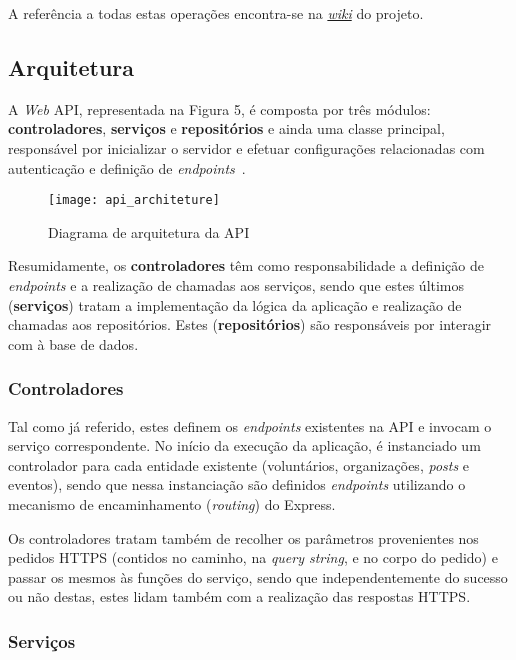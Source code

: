 A referência a todas estas operações encontra-se na \href{https://github.com/leomartins1999/PS1920-G46/wiki}{\textit{wiki}} do projeto.

\subsection{Arquitetura}

A \textit{Web} API, representada na Figura 5, é composta por três módulos: \textbf{controladores}, \textbf{serviços} e \textbf{repositórios} e ainda uma classe principal, responsável por inicializar o servidor e efetuar configurações relacionadas com autenticação e definição de \textit{endpoints}~\cite{Lauret2019,Block2014}.

\begin{figure}[h]
	\centering
	\texttt{[image: api\_architeture]}
	\caption{Diagrama de arquitetura da API}
\end{figure}

Resumidamente, os \textbf{controladores} têm como responsabilidade a definição de \textit{endpoints} e a realização de chamadas aos serviços, sendo que estes últimos (\textbf{serviços}) tratam a implementação da lógica da aplicação e realização de chamadas aos repositórios. Estes (\textbf{repositórios}) são responsáveis por interagir com à base de dados.

\subsubsection{Controladores}

Tal como já referido, estes definem os \textit{endpoints} existentes na API e invocam o serviço correspondente. No início da execução da aplicação, é instanciado um controlador para cada entidade existente (voluntários, organizações, \textit{posts} e eventos), sendo que nessa instanciação são definidos \textit{endpoints} utilizando o mecanismo de encaminhamento (\textit{routing}) do Express.

\medskip \par

Os controladores tratam também de recolher os parâmetros provenientes nos pedidos HTTPS (contidos no caminho, na \textit{query string}, e no corpo do pedido) e passar os mesmos às funções do serviço, sendo que independentemente do sucesso ou não destas, estes lidam também com a realização das respostas HTTPS.

\subsubsection{Serviços}

